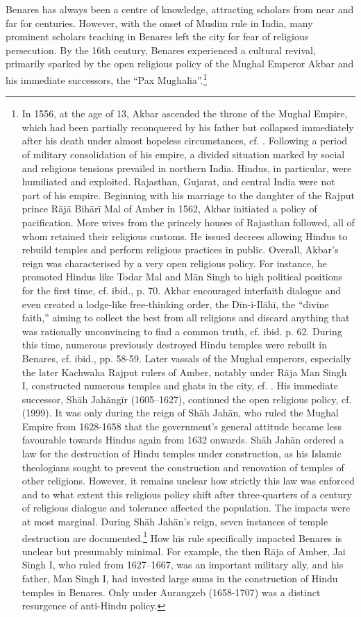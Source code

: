 Benares has always been a centre of knowledge, attracting scholars from near and far for centuries. However, with the onset of Muslim rule in India, many prominent scholars teaching in Benares left the city for fear of religious persecution. By the 16th century, Benares experienced a cultural revival, primarily sparked by the open religious policy of the Mughal Emperor Akbar and his immediate successors, the ``Pax Mughalia''.\footnote{In 1556, at the age of 13, Akbar ascended the throne of the Mughal Empire, which had been partially reconquered by his father but collapsed immediately after his death under almost hopeless circumstances, cf. \citeauthor[1989: 53]{stietencron1989}. Following a period of military consolidation of his empire, a divided situation marked by social and religious tensions prevailed in northern India. Hindus, in particular, were humiliated and exploited. Rajasthan, Gujarat, and central India were not part of his empire. Beginning with his marriage to the daughter of the Rajput prince Rājā Bihārī Mal of Amber in 1562, Akbar initiated a policy of pacification. More wives from the princely houses of Rajasthan followed, all of whom retained their religious customs. He issued decrees allowing Hindus to rebuild temples and perform religious practices in public. Overall, Akbar's reign was characterised by a very open religious policy. For instance, he promoted Hindus like Todar Mal and Mān Singh to high political positions for the first time, cf. ibid., p. 70. Akbar encouraged interfaith dialogue and even created a lodge-like free-thinking order, the Dīn-i-Ilāhī, the ``divine faith,'' aiming to collect the best from all religions and discard anything that was rationally unconvincing to find a common truth, cf. ibid. p. 62. During this time, numerous previously destroyed Hindu temples were rebuilt in Benares, cf. ibid., pp. 58-59. Later vassals of the Mughal emperors, especially the later Kachwaha Rajput rulers of Amber, notably under Rāja Man Singh I, constructed numerous temples and ghats in the city, cf. \citeauthor[2006: 493-495]{hooja2006}. His immediate successor, Shāh Jahāngīr (1605–1627), continued the open religious policy, cf. \citeauthor{jahangir1999} (1999). It was only during the reign of Shāh Jahān, who ruled the Mughal Empire from 1628-1658 that the government's general attitude became less favourable towards Hindus again from 1632 onwards. Shāh Jahān ordered a law for the destruction of Hindu temples under construction, as his Islamic theologians sought to prevent the construction and renovation of temples of other religions. However, it remains unclear how strictly this law was enforced and to what extent this religious policy shift after three-quarters of a century of religious dialogue and tolerance affected the population. The impacts were at most marginal. During Shāh Jahān's reign, seven instances of temple destruction are documented.\footnote{Cf. \citeauthor{eaton2001}.} How his rule specifically impacted Benares is unclear but presumably minimal. For example, the then Rāja of Amber, Jai Singh I, who ruled from 1627–1667, was an important military ally, and his father, Man Singh I, had invested large sums in the construction of Hindu temples in Benares. Only under Aurangzeb (1658-1707) was a distinct resurgence of anti-Hindu policy.} 